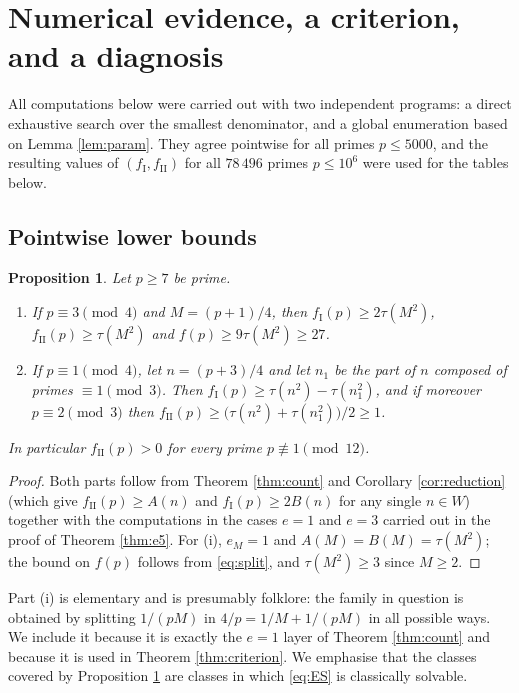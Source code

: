 \documentclass[11pt,reqno]{amsart}
\theoremstyle{plain}
\newtheorem{proposition}[theorem]{Proposition}
\theoremstyle{definition}
\numberwithin{equation}{section}
\newcommand{\fI}{f_{\mathrm{I}}}
\newcommand{\fII}{f_{\mathrm{II}}}
\begin{document}
\section{Numerical evidence, a criterion, and a diagnosis}\label{sec:num}

All computations below were carried out with two independent programs: a direct
exhaustive search over the smallest denominator, and a global enumeration based on
Lemma \ref{lem:param}. They agree pointwise for all primes $p\le5000$, and the
resulting values of $(\fI,\fII)$ for all $78\,496$ primes $p\le10^{6}$ were used for
the tables below.

\subsection{Pointwise lower bounds}

\begin{proposition}\label{prop:lower}
Let $p\ge7$ be prime.
\begin{enumerate}
\item[(i)] If $p\equiv3\pmod4$ and $M=(p+1)/4$, then $\fI(p)\ge2\tau(M^{2})$,
$\fII(p)\ge\tau(M^{2})$ and $f(p)\ge9\tau(M^{2})\ge27$.
\item[(ii)] If $p\equiv1\pmod4$, let $n=(p+3)/4$ and let $n_{1}$ be the part of $n$
composed of primes $\equiv1\pmod3$. Then
$\fI(p)\ge\tau(n^{2})-\tau(n_{1}^{2})$, and if moreover $p\equiv2\pmod3$ then
$\fII(p)\ge\bigl(\tau(n^{2})+\tau(n_{1}^{2})\bigr)/2\ge1$.
\end{enumerate}
In particular $\fII(p)>0$ for every prime $p\not\equiv1\pmod{12}$.
\end{proposition}

\begin{proof}
Both parts follow from Theorem \ref{thm:count} and Corollary \ref{cor:reduction}
(which give $\fII(p)\ge A(n)$ and $\fI(p)\ge2B(n)$ for any single $n\in W$)
together with the computations in the cases $e=1$ and $e=3$ carried out in the proof
of Theorem \ref{thm:e5}. For (i), $e_{M}=1$ and $A(M)=B(M)=\tau(M^{2})$; the bound on
$f(p)$ follows from \eqref{eq:split}, and $\tau(M^{2})\ge3$ since $M\ge2$.
\end{proof}

Part (i) is elementary and is presumably folklore: the family in question is obtained
by splitting $1/(pM)$ in $4/p=1/M+1/(pM)$ in all possible ways. We include it because
it is exactly the $e=1$ layer of Theorem \ref{thm:count} and because it is used in
Theorem \ref{thm:criterion}. We emphasise that the classes covered by Proposition
\ref{prop:lower} are classes in which \eqref{eq:ES} is classically solvable.
\end{document}

